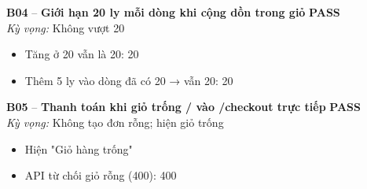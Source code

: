\documentclass[a4paper,11pt]{article}
\newcommand{\ok}{\textcolor{okgreen}{\textbf{PASS}}}
\begin{document}
\begin{minipage}{\textwidth}\vspace{4pt}\textbf{\textcolor{brew}{B04}} -- \textbf{Giới hạn 20 ly mỗi dòng khi cộng dồn trong giỏ} \hfill \ok\\
{\small\emph{Kỳ vọng:} Không vượt 20}
\end{minipage}
\begin{itemize}\footnotesize
\item \tick Tăng ở 20 vẫn là 20: 20
\item \tick Thêm 5 ly vào dòng đã có 20 → vẫn 20: 20
\end{itemize}
\begin{minipage}{\textwidth}\vspace{4pt}\textbf{\textcolor{brew}{B05}} -- \textbf{Thanh toán khi giỏ trống / vào /checkout trực tiếp} \hfill \ok\\
{\small\emph{Kỳ vọng:} Không tạo đơn rỗng; hiện giỏ trống}
\end{minipage}
\begin{itemize}\footnotesize
\item \tick Hiện "Giỏ hàng trống"
\item \tick API từ chối giỏ rỗng (400): 400
\end{itemize}
\end{document}
